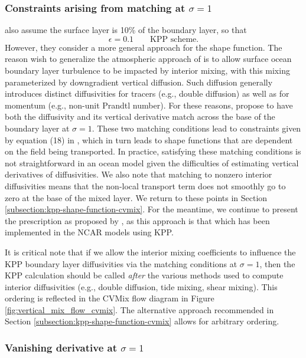 \subsubsection{Constraints arising from matching at $\sigma=1$}

\cite{LargeKPP} also assume the surface layer is 10\% of the boundary
layer, so that 
\begin{equation}
 \epsilon = 0.1 \qquad \mbox{KPP scheme.}
\end{equation}
However, they consider a more general approach for the shape function.
The reason \cite{LargeKPP} wish to generalize the atmospheric approach
of \cite{Troen_Mahrt1986} is to allow surface ocean boundary layer
turbulence to be impacted by interior mixing, with this mixing
parameterized by downgradient vertical diffusion.  Such diffusion
generally introduces distinct diffusivities for tracers (e.g., double
diffusion) as well as for momentum (e.g., non-unit Prandtl number).
For these reasons, \cite{LargeKPP} propose to have both the
diffusivity and its vertical derivative match across the base of the
boundary layer at $\sigma=1$.  These two matching conditions lead to
constraints given by equation (18) in \cite{LargeKPP}, which in turn
leads to shape functions that are dependent on the field being
transported.  In practice, satisfying these matching conditions is not
straightforward in an ocean model given the difficulties of estimating
vertical derivatives of diffusivities.  We also note that matching to
nonzero interior diffusivities means that the non-local transport term
does not smoothly go to zero at the base of the mixed layer.  We
return to these points in Section
\ref{subsection:kpp-shape-function-cvmix}. For the meantime, we
continue to present the prescription as proposed by \cite{LargeKPP},
as this approach is that which has been implemented in the NCAR models
using KPP.

It is critical note that if we allow the interior mixing coefficients
to influence the KPP boundary layer diffusivities via the matching
conditions at $\sigma=1$, then the KPP calculation should be called
{\it after} the various methods used to compute interior diffusivities
(e.g., double diffusion, tide mixing, shear mixing).  This ordering is
reflected in the CVMix flow diagram in Figure
\ref{fig:vertical_mix_flow_cvmix}.  The alternative approach
recommended in Section \ref{subsection:kpp-shape-function-cvmix}
allows for arbitrary ordering.


\subsubsection{Vanishing derivative at $\sigma=1$}

